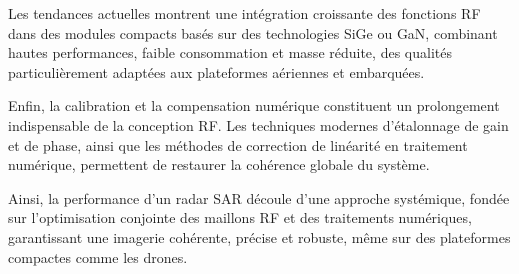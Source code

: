 Les tendances actuelles montrent une intégration croissante des fonctions RF dans des modules compacts basés sur des technologies SiGe ou GaN, combinant hautes performances, faible consommation et masse réduite, des qualités particulièrement adaptées aux plateformes aériennes et embarquées. 

Enfin, la calibration et la compensation numérique constituent un prolongement indispensable de la conception RF. Les techniques modernes d’étalonnage de gain et de phase, ainsi que les méthodes de correction de linéarité en traitement numérique, permettent de restaurer la cohérence globale du système. 

Ainsi, la performance d’un radar SAR découle d’une approche systémique, fondée sur l’optimisation conjointe des maillons RF et des traitements numériques, garantissant une imagerie cohérente, précise et robuste, même sur des plateformes compactes comme les drones.



